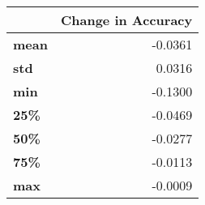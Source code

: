 \begin{tabular}{lr}
\toprule
{} &  Change in Accuracy \\
\midrule
\textbf{mean} &             -0.0361 \\
\textbf{std } &              0.0316 \\
\textbf{min } &             -0.1300 \\
\textbf{25\% } &             -0.0469 \\
\textbf{50\% } &             -0.0277 \\
\textbf{75\% } &             -0.0113 \\
\textbf{max } &             -0.0009 \\
\bottomrule
\end{tabular}
